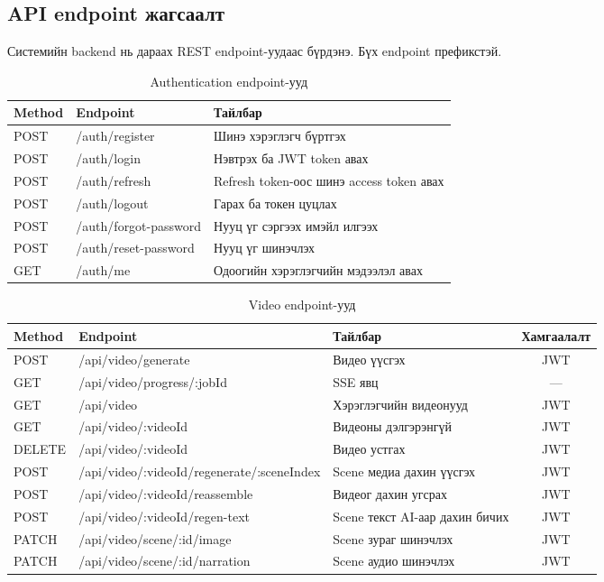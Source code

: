 \subsection{API endpoint жагсаалт}

Системийн backend нь дараах REST endpoint-уудаас бүрдэнэ. Бүх endpoint  префикстэй.

\begin{table}[H]
\centering
\label{tab:auth_api}
\begin{tabular}{|l|p{5cm}|p{5.5cm}|}
\hline
\textbf{Method} & \textbf{Endpoint} & \textbf{Тайлбар} \\
\hline
POST & /auth/register & Шинэ хэрэглэгч бүртгэх \\
\hline
POST & /auth/login & Нэвтрэх ба JWT token авах \\
\hline
POST & /auth/refresh & Refresh token-оос шинэ access token авах \\
\hline
POST & /auth/logout & Гарах ба токен цуцлах \\
\hline
POST & /auth/forgot-password & Нууц үг сэргээх имэйл илгээх \\
\hline
POST & /auth/reset-password & Нууц үг шинэчлэх \\
\hline
GET & /auth/me & Одоогийн хэрэглэгчийн мэдээлэл авах \\
\hline
\end{tabular}
\caption{Authentication endpoint-ууд}
\end{table}

\begin{table}[H]
\centering
\label{tab:video_api}
\footnotesize
\setlength{\tabcolsep}{3pt}
\begin{tabular}{|l|p{6.5cm}|p{3.2cm}|c|}
\hline
\textbf{Method} & \textbf{Endpoint} & \textbf{Тайлбар} & \textbf{Хамгаалалт} \\
\hline
POST & /api/video/generate & Видео үүсгэх & JWT \\
\hline
GET & /api/video/progress/:jobId & SSE явц & --- \\
\hline
GET & /api/video & Хэрэглэгчийн видеонууд & JWT \\
\hline
GET & /api/video/:videoId & Видеоны дэлгэрэнгүй & JWT \\
\hline
DELETE & /api/video/:videoId & Видео устгах & JWT \\
\hline
POST & /api/video/:videoId/regenerate/:sceneIndex & Scene медиа дахин үүсгэх & JWT \\
\hline
POST & /api/video/:videoId/reassemble & Видеог дахин угсрах & JWT \\
\hline
POST & /api/video/:videoId/regen-text & Scene текст AI-аар дахин бичих & JWT \\
\hline
PATCH & /api/video/scene/:id/image & Scene зураг шинэчлэх & JWT \\
\hline
PATCH & /api/video/scene/:id/narration & Scene аудио шинэчлэх & JWT \\
\hline
\end{tabular}
\caption{Video endpoint-ууд}
\end{table}

